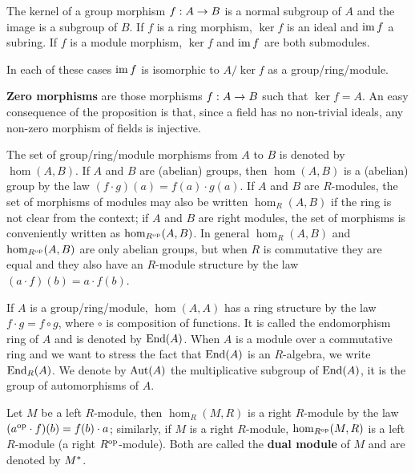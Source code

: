 \begin{proposition}
  \label{th:first-isomorphism}
  The kernel of a group morphism $f:A\rightarrow B$ is a normal subgroup of
  $A$ and the image is a subgroup of $B$.  If $f$ is a ring morphism,
  $\ker f$ is an ideal and $\operatorname{im} f$ a subring. If $f$ is a module
  morphism, $\ker f$ and $\operatorname{im} f$ are both submodules.
  
  In each of these cases $\operatorname{im} f$ is isomorphic to $A/\ker f$ as a
  group/ring/module.
\end{proposition}

 \textbf{Zero morphisms} are those
morphisms $f:A\rightarrow B$ such that $\ker f = A$.  An easy consequence of
the proposition is that, since a field has no non-trivial ideals, any
non-zero morphism of fields is injective.

The set of group/ring/module morphisms from $A$ to $B$ is denoted by
$\hom(A,B)$. If $A$ and $B$ are (abelian) groups, then $\hom (A,B)$ is
a (abelian) group by the law $(f\cdot g)(a) = f(a)\cdot g(a)$. If $A$
and $B$ are $R$-modules, the set of morphisms of modules may also be
written $\hom_R(A,B)$ if the ring is not clear from the context; if
$A$ and $B$ are right modules, the set of morphisms is conveniently
written as $\hom_{R^{\mathrm{op}}}(A,B)$. In general $\hom_R(A,B)$ and
$\hom_{R^{\mathrm{op}}}(A,B)$ are only abelian groups, but when $R$ is
commutative they are equal and they also have an $R$-module structure
by the law $(a\cdot f)(b) = a\cdot f(b)$.

If $A$ is a group/ring/module, $\hom(A,A)$ has a ring structure by the
law $f\cdot g=f\circ g$, where $\circ$ is composition of functions. It
is called the 
endomorphism ring of $A$ and is denoted by
$\operatorname{End}(A)$. When $A$ is a module over a commutative ring and we want to
stress the fact that $\operatorname{End}(A)$ is an $R$-algebra, we write
$\operatorname{End}_R(A)$. We denote by $\operatorname{Aut}(A)$ the multiplicative subgroup of
$\operatorname{End}(A)$, it is the group of automorphisms of $A$.

Let $M$ be a left $R$-module, then $\hom_R(M,R)$ is a right $R$-module
by the law $(a^{\mathrm{op}} \cdot f)(b) = f(b)\cdot a$; similarly, if $M$ is a
right $R$-module, $\hom_{R^{\mathrm{op}}}(M,R)$ is a left $R$-module (a right
$R^{\mathrm{op}}$-module). Both are called the
\textbf{dual module}
of $M$ and are denoted by $M^\ast$.

